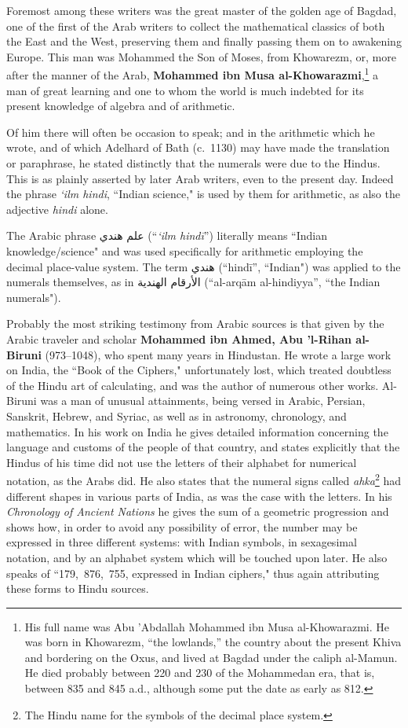 \documentclass[11pt,a4paper]{article}
\newcommand{\ar}[1]{{\arabicfont #1}}
\newenvironment{enhancednote}{%
  \begin{tcolorbox}[colback=enhancedbg,colframe=notecolor,boxrule=1pt,
    left=10pt,right=10pt,top=8pt,bottom=8pt,
    title={\textbf{Enhanced Edition Note}},fonttitle=\bfseries\color{notecolor}]
}{\end{tcolorbox}}
\begin{document}
Foremost among these writers was the great master of the golden age of Bagdad, one of the first of the Arab writers to collect the mathematical classics of both the East and the West, preserving them and finally passing them on to awakening Europe. This man was Mohammed the Son of Moses, from Khowarezm, or, more after the manner of the Arab, \textbf{Mohammed ibn Musa al-Khowarazmi},\footnote{His full name was Abu 'Abdallah Mohammed ibn Musa al-Khowarazmi. He was born in Khowarezm, ``the lowlands,'' the country about the present Khiva and bordering on the Oxus, and lived at Bagdad under the caliph al-Mamun. He died probably between 220 and 230 of the Mohammedan era, that is, between 835 and 845 a.d., although some put the date as early as 812.} a man of great learning and one to whom the world is much indebted for its present knowledge of algebra and of arithmetic.

Of him there will often be occasion to speak; and in the arithmetic which he wrote, and of which Adelhard of Bath (c.~1130) may have made the translation or paraphrase, he stated distinctly that the numerals were due to the Hindus. This is as plainly asserted by later Arab writers, even to the present day. Indeed the phrase \textit{`ilm hindi}, ``Indian science," is used by them for arithmetic, as also the adjective \textit{hindi} alone.

\begin{enhancednote}
The Arabic phrase \ar{علم هندي} (``\textit{`ilm hind\=i}'') literally means ``Indian knowledge/science" and was used specifically for arithmetic employing the decimal place-value system. The term \ar{هندي} (``hind\=i'', ``Indian") was applied to the numerals themselves, as in \ar{الأرقام الهندية} (``al-arq\=am al-hindiyya'', ``the Indian numerals").
\end{enhancednote}

Probably the most striking testimony from Arabic sources is that given by the Arabic traveler and scholar \textbf{Mohammed ibn Ahmed, Abu 'l-Rihan al-Biruni} (973--1048), who spent many years in Hindustan. He wrote a large work on India, the ``Book of the Ciphers," unfortunately lost, which treated doubtless of the Hindu art of calculating, and was the author of numerous other works. Al-Biruni was a man of unusual attainments, being versed in Arabic, Persian, Sanskrit, Hebrew, and Syriac, as well as in astronomy, chronology, and mathematics. In his work on India he gives detailed information concerning the language and customs of the people of that country, and states explicitly that the Hindus of his time did not use the letters of their alphabet for numerical notation, as the Arabs did. He also states that the numeral signs called \textit{ahka}\footnote{The Hindu name for the symbols of the decimal place system.} had different shapes in various parts of India, as was the case with the letters. In his \textit{Chronology of Ancient Nations} he gives the sum of a geometric progression and shows how, in order to avoid any possibility of error, the number may be expressed in three different systems: with Indian symbols, in sexagesimal notation, and by an alphabet system which will be touched upon later. He also speaks of ``179,~876,~755, expressed in Indian ciphers," thus again attributing these forms to Hindu sources.
\end{document}

